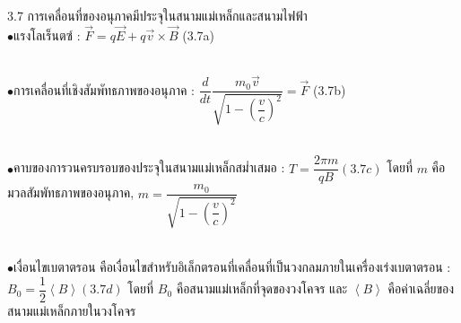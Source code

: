 \documentclass[a4paper,12pt]{article}
\begin{document}
3.7 การเคลื่อนที่ของอนุภาคมีประจุในสนามแม่เหล็กและสนามไฟฟ้า
~\\ $\bullet$แรงโลเร็นตซ์ :
$\vec{F} = q\vec{E}+q\vec{v}\times\vec{B}$                              (3.7a)

~\\ $\bullet$การเคลื่อนที่เชิงสัมพัทธภาพของอนุภาค :
$\dfrac{d}{dt}\dfrac{m_{0}\vec{v}}{\sqrt{1-(\dfrac{v}{c})^{2}}} = \vec{F}$                            (3.7b)

~\\ $\bullet$คาบของการวนครบรอบของประจุในสนามแม่เหล็กสม่ำเสมอ :
$T = \dfrac{2\pi m}{qB}                                                 (3.7c)$
โดยที่ $m$ คือมวลสัมพัทธภาพของอนุภาค, $m = \dfrac{m_{0}}{\sqrt{1 - (\dfrac{v}{c})^{2}}}$

~\\ $\bullet$เงื่อนไขเบตาตรอน คือเงื่อนไขสำหรับอิเล็กตรอนที่เคลื่อนที่เป็นวงกลมภายในเครื่องเร่งเบตาตรอน :
$B_{0} = \dfrac{1}{2}\left\langle B \right\rangle                                (3.7d)$
โดยที่ $B_{0}$ คือสนามแม่เหล็กที่จุดของวงโคจร และ $\left\langle B \right\rangle$  คือค่าเฉลี่ยของสนามแม่เหล็กภายในวงโคจร
\end{document}
